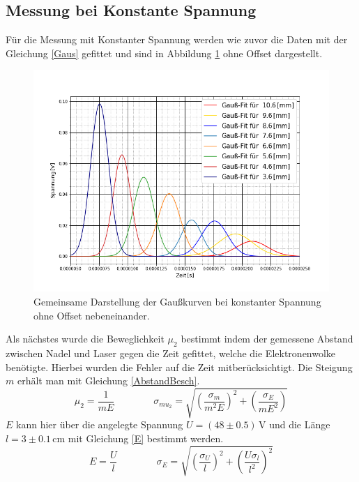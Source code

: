 	\subsection{Messung bei Konstante Spannung}
	Für die Messung mit Konstanter Spannung werden wie zuvor die Daten mit der Gleichung \ref{Gaus} gefittet und sind in Abbildung \ref{Abstand1} ohne Offset dargestellt.\par
	\FloatBarrier
	\begin{figure}[ht]
		\includegraphics[scale=0.5]{Bild/V2Spannung1}
		\centering
		\caption[Darstellung der Gaußkurven bei konst. Spannung]{\small Gemeinsame Darstellung der Gaußkurven bei konstanter Spannung ohne Offset nebeneinander.}
		\label{Abstand1}
	\end{figure}
	\FloatBarrier
	Als nächstes wurde die Beweglichkeit $\mu_2$ bestimmt indem der gemessene Abstand zwischen Nadel und Laser gegen die Zeit gefittet, welche die Elektronenwolke benötigte. Hierbei wurden die Fehler auf die Zeit mitberücksichtigt. Die Steigung $m$ erhält man mit Gleichung \ref{AbstandBesch}.
	\begin{equation}
		\mu_2=\frac{1}{mE} \qquad \qquad \sigma_{mu_2}=\sqrt{\left(\frac{\sigma_{m}}{m^2E}\right)^2+\left(\frac{\sigma_{E}}{mE^2}\right)}
		\label{AbstandBesch}
	\end{equation}
	$E$ kann hier über die angelegte Spannung $U=(48\pm0.5)\,$V und die Länge $l=3\pm0.1\,$cm mit Gleichung \ref{E} bestimmt werden.
	\begin{equation}
		E=\frac{U}{l} \qquad \qquad \sigma_E=\sqrt{\left(\frac{\sigma_U}{l}\right)^2+\left(\frac{U\sigma_l}{l^2}\right)^2}
		\label{E}
	\end{equation}
